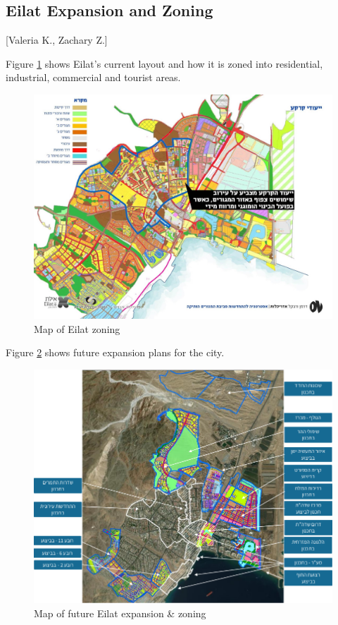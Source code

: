 \documentclass[12pt]{article}                               %
\begin{document}
\subsection{Eilat Expansion and Zoning}[Valeria K., Zachary Z.]

Figure \ref{img:eilat_zoning} shows Eilat's current layout and how it is zoned into residential, industrial, commercial and tourist areas. 

\begin{figure}[H]
    \centering
    \includegraphics[width=0.8\columnwidth]{images/eilat_zoning.jpg}
    \caption{Map of Eilat zoning}
    \label{img:eilat_zoning}
\end{figure}
Figure \ref{img:eilat_expansion} shows future expansion plans for the city.

\begin{figure}[H]
    \centering
    \includegraphics[width=0.9\columnwidth]{images/eilat_zoning_future.png}
    \caption{Map of future Eilat expansion \& zoning}
    \label{img:eilat_expansion}
\end{figure}
\end{document}
